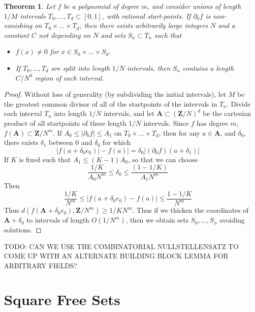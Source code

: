 \documentclass{report}
\theoremstyle{plain}
\theoremstyle{plain}
\newtheorem{theorem}{Theorem}
\begin{document}
\begin{theorem}
    Let $f$ be a polynomial of degree $m$, and consider unions of length $1/M$ intervals $T_0, \dots, T_d \subset [0,1]$, with rational start-points. If $\partial_0 f$ is non-vanishing on $T_0 \times \dots \times T_d$, then there exists arbitrarily large integers $N$ and a constant $C$ not depending on $N$ and sets $S_n \subset T_n$ such that
    \begin{itemize}
        \item $f(x) \neq 0$ for $x \in S_0 \times \dots \times S_d$.
        \item If $T_0, \dots, T_d$ are split into length $1/N$ intervals, then $S_n$ contains a length $C/N^d$ region of each interval.
    \end{itemize}
\end{theorem}
\begin{proof}
    Without loss of generality (by subdividing the initial intervals), let $M$ be the greatest common divisor of all of the startpoints of the intervals in $T_n$. Divide each interval $T_n$ into length $1/N$ intervals, and let $\mathbf{A} \subset (\mathbf{Z}/N)^d$ be the cartesian product of all startpoints of these length $1/N$ intervals. Since $f$ has degree $m$, $f(\mathbf{A}) \subset \mathbf{Z}/N^m$. If $A_0 \leq |\partial_0 f| \leq A_1$ on $T_0 \times \dots \times T_d$, then for any $a \in \mathbf{A}$, and $\delta_0$, there exists $\delta_1$ between $0$ and $\delta_0$ for which
    \[ |f(a + \delta_0 e_0)| - f(a)| = \delta_0 |(\partial_0 f)(a + \delta_1)| \]
    If $K$ is fixed such that $A_1 \leq (K-1)A_0$, so that we can choose
    \[ \frac{1/K}{A_0N^m} \leq \delta_0 \leq \frac{\left( 1 - 1/K \right)}{A_1N^m} \]
    Then
    \[ \frac{1/K}{N^m} \leq |f(a + \delta_0 e_0) - f(a)| \leq \frac{1 - 1/K}{N^m} \]
    Thus $d(f(\mathbf{A} + \delta_0 e_0), \mathbf{Z}/N^m) \geq 1/KN^m$. Thus if we thicken the coordinates of $\mathbf{A} + \delta_0$ to intervals of length $O(1/N^m)$, then we obtain sets $S_0, \dots, S_n$ avoiding solutions.
\end{proof}

TODO: CAN WE USE THE COMBINATORIAL NULLSTELLENSATZ TO COME UP WITH AN ALTERNATE BUILDING BLOCK LEMMA FOR ARBITRARY FIELDS?

\section{Square Free Sets}
\end{document}
